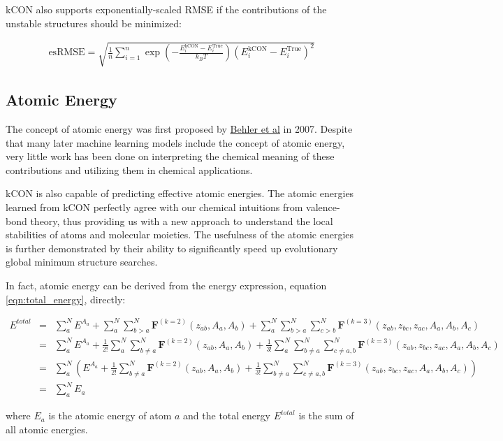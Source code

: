 \noindent kCON also supports exponentially-scaled RMSE if the contributions of the unstable 
structures should be minimized:

\begin{eqnarray}
\mathrm{esRMSE} = \sqrt{
	\frac{1}{n} 
	\sum_{i=1}^{n}{
		\exp{\left(-\frac{E_{i}^{\mathrm{kCON}} - E_{i}^{\mathrm{True}}}{k_BT} \right)}
		\left(E_{i}^{\mathrm{kCON}} - E_{i}^{\mathrm{True}} \right)^2
	}
}	
\end{eqnarray}

\subsection{Atomic Energy}

The concept of atomic energy was first proposed by 
\href{https://journals.aps.org/prl/abstract/10.1103/PhysRevLett.98.146401}{Behler et al} in 
2007. Despite that many later machine learning models include the concept of atomic energy, 
very little work has been done on interpreting the chemical meaning of these contributions and 
utilizing them in chemical applications. 

kCON is also capable of predicting effective atomic energies. The atomic energies learned from 
kCON perfectly agree with our chemical intuitions from valence-bond theory, thus providing us 
with a new approach to understand the local stabilities of atoms and molecular moieties. The 
usefulness of the atomic energies is further demonstrated by their ability to significantly 
speed up evolutionary global minimum structure searches. 

In fact, atomic energy can be derived from the energy expression, equation 
\ref{eqn:total_energy}, directly:

\begin{eqnarray}
E^{total}
& = &
\sum_{a}^{N}{E^{A_a}} + 
\sum_{a}^{N}{\sum_{b>a}^{N}{\mathbf{F}^{(k=2)}(z_{ab}, A_a, A_b)}} + 
\sum_{a}^{N}{\sum_{b>a}^{N}{\sum_{c>b}^{N}{
	\mathbf{F}^{(k=3)}(z_{ab}, z_{bc}, z_{ac}, A_a, A_b, A_c)}}
} \nonumber \\
& = &
\sum_{a}^{N}{E^{A_a}} + 
\frac{1}{2!}\sum_{a}^{N}{\sum_{b \neq a}^{N}{\mathbf{F}^{(k=2)}(z_{ab}, A_a, A_b)}} + 
\frac{1}{3!}\sum_{a}^{N}{\sum_{b \neq a}^{N}{\sum_{c \neq a,b}^{N}{
	\mathbf{F}^{(k=3)}(z_{ab}, z_{bc}, z_{ac}, A_a, A_b, A_c)}}
} \nonumber \\
& = &
\sum_{a}^{N}{\left(E^{A_a} + 
\frac{1}{2!}\sum_{b \neq a}^{N}{\mathbf{F}^{(k=2)}(z_{ab}, A_a, A_b)} + 
\frac{1}{3!}\sum_{b \neq a}^{N}{\sum_{c \neq a,b}^{N}{
	\mathbf{F}^{(k=3)}(z_{ab}, z_{bc}, z_{ac}, A_a, A_b, A_c)}}
\right)} \nonumber \\
& = & 
\sum_{a}^{N}{E_{a}}
\end{eqnarray}

\noindent where $E_{a}$ is the atomic energy of atom $a$ and the total energy $E^{total}$ is 
the sum of all atomic energies.

